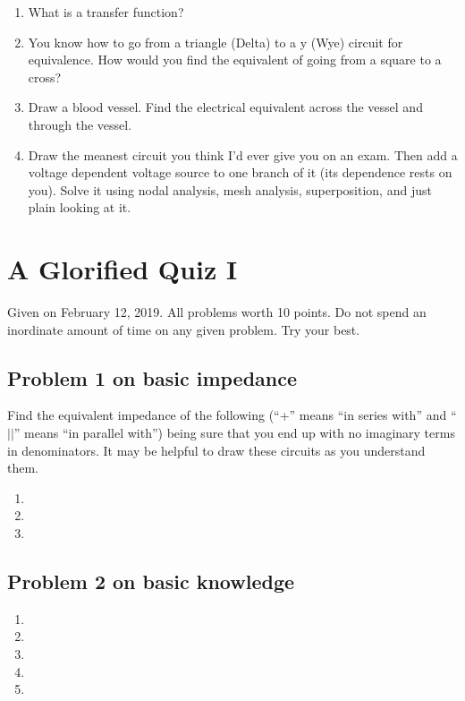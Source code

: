 \documentclass[11pt]{book}
\begin{document}
\begin{enumerate}
	\item What is a transfer function?
	\item You know how to go from a triangle (Delta) to a y (Wye) circuit for equivalence. How would you find the equivalent of going from a square to a cross?
	\item 	Draw a blood vessel. Find the electrical equivalent across the vessel and through the vessel.
	\item Draw the meanest circuit you think I’d ever give you on an exam. Then add a voltage dependent voltage source to one branch of it (its dependence rests on you). Solve it using nodal analysis, mesh analysis, superposition, and just plain looking at it.
\end{enumerate}



\chapter*{A Glorified Quiz I}
Given on February 12, 2019. All problems worth 10 points. Do not spend an inordinate amount of time on any given problem. Try your best.
\minitoc
\newpage

\section{Problem 1 on basic impedance}

Find the equivalent impedance of the following (``+'' means ``in series with'' and ``$\vert\vert$'' means ``in parallel with'') being sure that you end up with no imaginary terms in denominators. It may be helpful to draw these circuits as you understand them.
\begin{enumerate}
	\item 
	\item 
	\item 
\end{enumerate}


\section{Problem 2 on basic knowledge}
\begin{enumerate}
	\item 
	\item 
	\item 
	\item 
	\item 
\end{enumerate}
\end{document}
